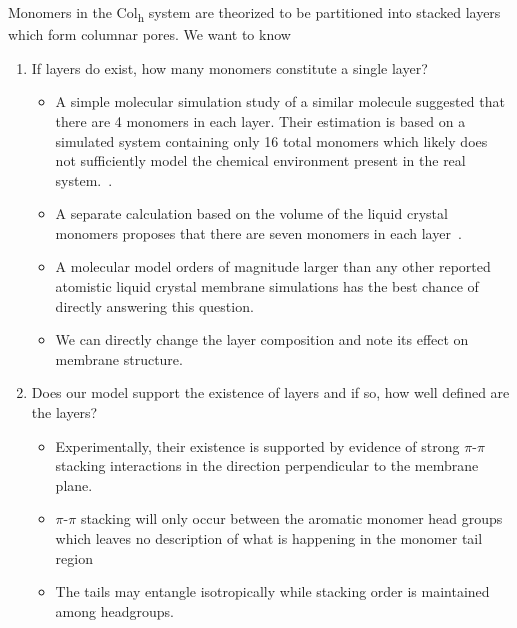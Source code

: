 \documentclass{article}
\begin{document}
  Monomers in the Col\textsubscript{h} system are theorized to be partitioned
  into stacked layers which form columnar pores. 
We want to know 
\begin{enumerate}
\item If layers do exist, how many monomers constitute a single layer? \label{point:monomernum}
  \begin{itemize}
    \item A simple molecular simulation study of a similar molecule suggested
    that there are 4 monomers in each layer. Their estimation is based on a
    simulated system containing only 16 total monomers which likely does not sufficiently
    model the chemical environment present in the real system.~\cite{zhu_methacrylated_2006}. 
    \item A separate calculation based on the volume of the liquid crystal monomers proposes
    that there are seven monomers in each layer~\cite{resel_structural_2000}. 
    \item A molecular model orders of magnitude larger than any other reported atomistic 
    liquid crystal membrane simulations has the best chance of directly answering this question.
    \item We can directly change the layer composition and note its effect on membrane structure.
  \end{itemize}

 \item Does our model support the existence of layers and if so, how well defined
  are the layers? \label{point:layers}
  \begin{itemize}
       \item Experimentally, their existence is supported by evidence of strong 
       $\pi$-$\pi$ stacking interactions in the direction perpendicular to the
       membrane plane.
       \item $\pi$-$\pi$ stacking will only occur between the aromatic monomer head groups which
       leaves no description of what is happening in the monomer tail region
       \item The tails may entangle isotropically while stacking order is maintained
       among headgroups. 
  \end{itemize}  
  

\end{enumerate}
\end{document}
